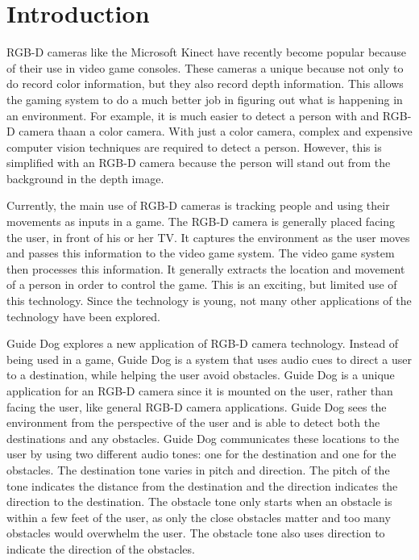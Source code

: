 \section{Introduction}
\label{sec:intro}

RGB-D cameras like the Microsoft Kinect\cite{kinect-website} have recently
become popular because of their use in video game consoles. These cameras a
unique because not only to do record color information, but they also record
depth information. This allows the gaming system to do a much better job in
figuring out what is happening in an environment. For example, it is much easier
to detect a person with and RGB-D camera thaan a color camera. With just a color
camera, complex and expensive computer vision techniques are required to detect
a person. However, this is simplified with an RGB-D camera because the person
will stand out from the background in the depth image.

Currently, the main use of RGB-D cameras is tracking people and using their
movements as inputs in a game. The RGB-D camera is generally placed facing the
user, in front of his or her TV. It captures the environment as the user moves
and passes this information to the video game system. The video game system then
processes this information. It generally extracts the location and movement of a
person in order to control the game. This is an exciting, but limited use of
this technology. Since the technology is young, not many other applications of
the technology have been explored.

Guide Dog explores a new application of RGB-D camera technology. Instead of
being used in a game, Guide Dog is a system that uses audio cues to direct a
user to a destination, while helping the user avoid obstacles. Guide Dog is a
unique application for an RGB-D camera since it is mounted on the user, rather
than facing the user, like general RGB-D camera applications. Guide Dog sees the
environment from the perspective of the user and is able to detect both the
destinations and any obstacles. Guide Dog communicates these locations to the
user by using two different audio tones: one for the destination and one for the
obstacles. The destination tone varies in pitch and direction. The pitch of the
tone indicates the distance from the destination and the direction indicates the
direction to the destination. The obstacle tone only starts when an obstacle is
within a few feet of the user, as only the close obstacles matter and too many
obstacles would overwhelm the user. The obstacle tone also uses direction to
indicate the direction of the obstacles.

